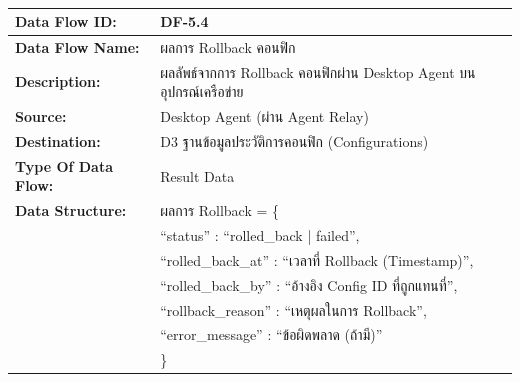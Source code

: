 \begin{table}[H]
    \caption{}
    \label{tab:df-5-4}
    \fontSixTeen 
    \begin{tabularx}{\textwidth}{|l|L|} 
        \hline
        \textbf{Data Flow ID:} & DF-5.4 \\
        \hline
        \textbf{Data Flow Name:} & ผลการ Rollback คอนฟิก \\
        \hline
        \textbf{Description:} & ผลลัพธ์จากการ Rollback คอนฟิกผ่าน Desktop Agent บนอุปกรณ์เครือข่าย \\
        \hline
        \textbf{Source:} & Desktop Agent (ผ่าน Agent Relay) \\
        \hline
        \textbf{Destination:} & D3 ฐานข้อมูลประวัติการคอนฟิก (Configurations) \\
        \hline
        \textbf{Type Of Data Flow:} & Result Data \\
        \hline
        \textbf{Data Structure:} & ผลการ Rollback = \{ \nonumber \\
                        & \hspace{1em} ``status'' : ``rolled\_back | failed'', \nonumber \\
                        & \hspace{1em} ``rolled\_back\_at'' : ``เวลาที่ Rollback (Timestamp)'', \nonumber \\
                        & \hspace{1em} ``rolled\_back\_by'' : ``อ้างอิง Config ID ที่ถูกแทนที่'', \nonumber \\
                        & \hspace{1em} ``rollback\_reason'' : ``เหตุผลในการ Rollback'', \nonumber \\
                        & \hspace{1em} ``error\_message'' : ``ข้อผิดพลาด (ถ้ามี)'' \nonumber \\
                        & \} \\
        \hline
    \end{tabularx}
\end{table}



